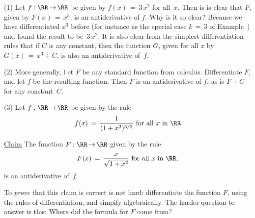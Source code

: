 \V

\hspace*{\parindent}(1) Let $f:{\RR} \,{\rightarrow}\, {\RR}$ be given by $f(x) \,=\, 3\,x^{2}$ for all~$x$.
    Then is is clear that $F$, given by $F(x) \,=\, x^{3}$, is an antiderivative of $f$. Why is it so clear?
    Because we have differentiated $x^{3}$ before (for instance as the special case $k \,=\, 3$ of Example~) and found the result to be~$3\,x^{2}$.
    It is also clear from the simplest differentiation rules that if $C$ is any constant, then the function $G$, given for all $x$ by $G(x) \,=\, x^{3} + C$, is also an antiderivative of~$f$.

\V

        (2) More generally, l et $F$ be any standard function from calculus. Differentiate $F$, and let $f$ be the resulting function.
    Then $F$ is an antiderivative of $f$, as is $F+C$ for any constant~$C$.

\V

        (3) Let $f:{\RR} \,{\rightarrow}\, {\RR}$ be given by the rule
        \begin{displaymath}
        f(x) \,=\, \frac{1}{(1+x^{2})^{3/2}} \mbox{ for all $x$ in ${\RR}$}
        \end{displaymath}


        \underline{Claim} The function $F:{\RR} \,{\rightarrow}\, {\RR}$ given by the rule
        \begin{displaymath}
        F(x) \,=\, \frac{x}{\sqrt{1+x^{2}}} \mbox{ for all $x$ in~${\RR}$},
        \end{displaymath}
    is an antiderivative of~$f$.

        To {\em prove} that this claim is correct is not hard: differentiate the function $F$, using the rules of differentiation, and simpify algebraically.
    The harder question to answer is this: Where did the formula for $F$ come from?

\VV

